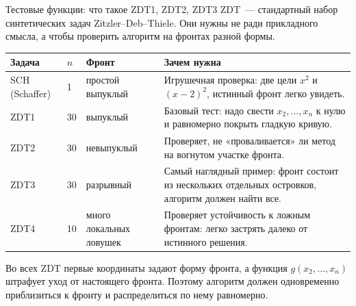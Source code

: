 \documentclass[aspectratio=169,11pt]{beamer}
\begin{document}
\begin{frame}{Тестовые функции: что такое ZDT1, ZDT2, ZDT3}\scriptsize
  \renewcommand{\arraystretch}{1.13}
  ZDT~--- стандартный набор синтетических задач Zitzler--Deb--Thiele. Они нужны не ради прикладного смысла, а чтобы проверить алгоритм на фронтах разной формы.
  \vspace{0.12cm}
  \begin{tabular}{p{}p{}p{}p{}}
    \toprule
    \textbf{Задача} & \textbf{$n$} & \textbf{Фронт} & \textbf{Зачем нужна} \\
    \midrule
    SCH (Schaffer) & 1 & простой выпуклый & Игрушечная проверка: две цели $x^2$ и $(x-2)^2$, истинный фронт легко увидеть. \\
    ZDT1 & 30 & выпуклый & Базовый тест: надо свести $x_2,\ldots,x_n$ к нулю и равномерно покрыть гладкую кривую. \\
    ZDT2 & 30 & невыпуклый & Проверяет, не «проваливается» ли метод на вогнутом участке фронта. \\
    ZDT3 & 30 & разрывный & Самый наглядный пример: фронт состоит из нескольких отдельных островков, алгоритм должен найти все. \\
    ZDT4 & 10 & много локальных ловушек & Проверяет устойчивость к ложным фронтам: легко застрять далеко от истинного решения. \\
    \bottomrule
  \end{tabular}
  \vspace{0.12cm}
  \footnotesize
  Во всех ZDT первые координаты задают форму фронта, а функция $g(x_2,\ldots,x_n)$ штрафует уход от настоящего фронта. Поэтому алгоритм должен одновременно приблизиться к фронту и распределиться по нему равномерно.
\end{frame}
\end{document}
